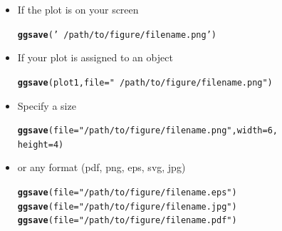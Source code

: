\documentclass{beamer}\usepackage[]{graphicx}\usepackage[]{color}
\makeatletter
\newcommand{\hlnum}[1]{\textcolor[rgb]{0.686,0.059,0.569}{#1}}%
\newcommand{\hlstr}[1]{\textcolor[rgb]{0.192,0.494,0.8}{#1}}%
\newcommand{\hlstd}[1]{\textcolor[rgb]{0.345,0.345,0.345}{#1}}%
\newcommand{\hlkwc}[1]{\textcolor[rgb]{0.333,0.667,0.333}{#1}}%
\newcommand{\hlkwd}[1]{\textcolor[rgb]{0.737,0.353,0.396}{\textbf{#1}}}%
\newenvironment{kframe}{%
 \def\at@end@of@kframe{}%
 \ifinner\ifhmode%
  \def\at@end@of@kframe{\end{minipage}}%
  \begin{minipage}{\columnwidth}%
 \fi\fi%
 \def\FrameCommand##1{\hskip\@totalleftmargin \hskip-\fboxsep
 \colorbox{shadecolor}{##1}\hskip-\fboxsep
     \hskip-\linewidth \hskip-\@totalleftmargin \hskip\columnwidth}%
 \MakeFramed {\advance\hsize-\width
   \@totalleftmargin\z@ \linewidth\hsize
   \@setminipage}}%
 {\par\unskip\endMakeFramed%
 \at@end@of@kframe}
\newenvironment{knitrout}{}{} %
\makeatother
\begin{document}


\begin{frame}[fragile]
\begin{itemize}
\item If the plot is on your screen
\begin{knitrout}\footnotesize
{}\color{fgcolor}\begin{kframe}
\begin{alltt}
\hlkwd{ggsave}\hlstd{(}\hlstr{'~/path/to/figure/filename.png'}\hlstd{)}
\end{alltt}
\end{kframe}
\end{knitrout}
\item If your plot is assigned to an object
\begin{knitrout}\footnotesize
{}\color{fgcolor}\begin{kframe}
\begin{alltt}
\hlkwd{ggsave}\hlstd{(plot1,} \hlkwc{file} \hlstd{=} \hlstr{"~/path/to/figure/filename.png"}\hlstd{)}
\end{alltt}
\end{kframe}
\end{knitrout}

\item Specify a size
\begin{knitrout}\footnotesize
{}\color{fgcolor}\begin{kframe}
\begin{alltt}
\hlkwd{ggsave}\hlstd{(}\hlkwc{file} \hlstd{=} \hlstr{"/path/to/figure/filename.png"}\hlstd{,} \hlkwc{width} \hlstd{=} \hlnum{6}\hlstd{,}
\hlkwc{height} \hlstd{=}\hlnum{4}\hlstd{)}
\end{alltt}
\end{kframe}
\end{knitrout}
\item or any format (pdf, png, eps, svg, jpg)
\begin{knitrout}\footnotesize
{}\color{fgcolor}\begin{kframe}
\begin{alltt}
\hlkwd{ggsave}\hlstd{(}\hlkwc{file} \hlstd{=} \hlstr{"/path/to/figure/filename.eps"}\hlstd{)}
\hlkwd{ggsave}\hlstd{(}\hlkwc{file} \hlstd{=} \hlstr{"/path/to/figure/filename.jpg"}\hlstd{)}
\hlkwd{ggsave}\hlstd{(}\hlkwc{file} \hlstd{=} \hlstr{"/path/to/figure/filename.pdf"}\hlstd{)}
\end{alltt}
\end{kframe}
\end{knitrout}
\end{itemize}
\end{frame}
\end{document}

